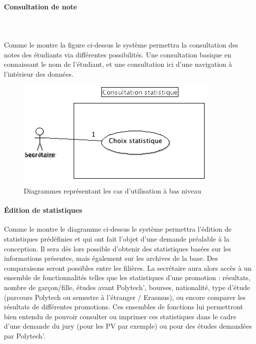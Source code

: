 \documentclass[letter, 11pt] {article}
\begin{document}
\paragraph{Consultation de note}~	\paragraph{ } Comme le montre la figure ci-dessus le système permettra la consultation des notes des étudiants via différentes possibilités. Une consultation basique en connaissant le nom de l'étudiant, et une consultation ici d'une navigation à l'intérieur des données.


\begin{figure}[!h]	
\includegraphics[scale = 0.7]{../UseCase/UseCaseBasNiveau/ConsultationStatistique.png}
\caption{Diagrammes représentant les cas d'utilisation à bas niveau}
\end{figure}

\paragraph{Édition de statistiques}
Comme le montre le diagramme ci-dessus le système permettra l'édition de statistiques prédéfinies et qui ont fait l'objet d'une demande préalable à la conception. Il sera dès lors possible d'obtenir des statistiques basées sur les informations présentes, mais également sur les archives de la base. Des comparaisons seront possibles entre les filières. 
La secrétaire aura alors accès à un ensemble de fonctionnalités telles que les statistiques d'une promotion : résultats, nombre de garçon/fille, études avant Polytech', bourses, nationalité, type d'étude (parcours Polytech ou semestre à l'étranger / Erasmus), ou encore comparer les résultats de différentes promotions. Ces ensembles de fonctions lui permettront bien entendu de pouvoir consulter ou imprimer ces statistiques dans le cadre d'une demande du jury (pour les 
PV par exemple) ou pour des études demandées par Polytech'.
\end{document}
